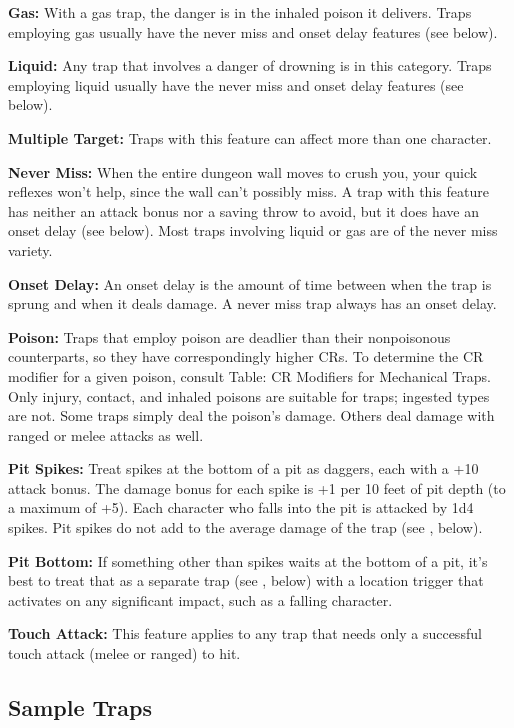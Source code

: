 \textbf{Gas:} With a gas trap, the danger is in the inhaled poison it delivers. 
Traps employing gas usually have the never miss and onset delay features (see below).

\textbf{Liquid:} Any trap that involves a danger of drowning is in this category. 
Traps employing liquid usually have the never miss and onset delay features (see 
below). 

\textbf{Multiple Target:} Traps with this feature can affect more than one character.

\textbf{Never Miss:} When the entire dungeon wall moves to crush you, your quick 
reflexes won't help, since the wall can't possibly miss. A trap with this feature 
has neither an attack bonus nor a saving throw to avoid, but it does have an onset 
delay (see below). Most traps involving liquid or gas are of the never miss variety. 

\textbf{Onset Delay:} An onset delay is the amount of time between when the trap 
is sprung and when it deals damage. A never miss trap always has an onset delay.

\textbf{Poison:} Traps that employ poison are deadlier than their nonpoisonous 
counterparts, so they have correspondingly higher CRs. To determine the CR modifier 
for a given poison, consult Table: CR Modifiers for Mechanical Traps. Only injury, 
contact, and inhaled poisons are suitable for traps; ingested types are not. Some 
traps simply deal the poison's damage. Others deal damage with ranged or melee 
attacks as well. 

\textbf{Pit Spikes:} Treat spikes at the bottom of a pit as daggers, each with 
a +10 attack bonus. The damage bonus for each spike is +1 per 10 feet of pit depth 
(to a maximum of +5). Each character who falls into the pit is attacked by 1d4 
spikes. Pit spikes do not add to the average damage of the trap (see , 
below).

\textbf{Pit Bottom:} If something other than spikes waits at the bottom of a pit, 
it's best to treat that as a separate trap (see , below) with a location 
trigger that activates on any significant impact, such as a falling character. 

\textbf{Touch Attack:} This feature applies to any trap that needs only a successful 
touch attack (melee or ranged) to hit.

\subsection{Sample Traps}

